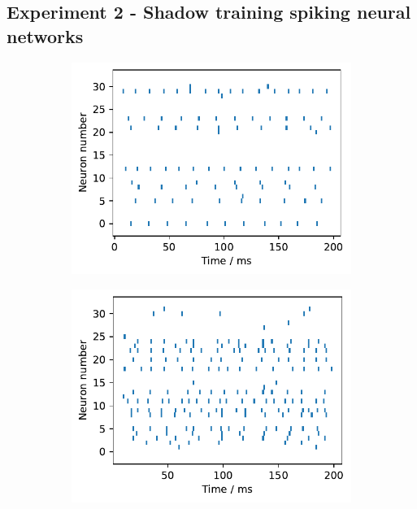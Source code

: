 \documentclass[a4paper,11pt]{article} %
\begin{document}
\subsection{Experiment 2 - Shadow training spiking neural networks}
\begin{figure}[ht]
  \begin{subfigure}[t]{0.32\columnwidth}
    \includegraphics[width=\linewidth]{graphics/spikes_0.pdf}  
  \end{subfigure}
  \hfill
  \begin{subfigure}[t]{0.32\columnwidth}
    \includegraphics[width=\linewidth]{graphics/spikes_1.pdf}  
  \end{subfigure}
  \hfill
  \begin{subfigure}[t]{0.32\columnwidth}

\end{subfigure}
\end{figure}
\end{document}
